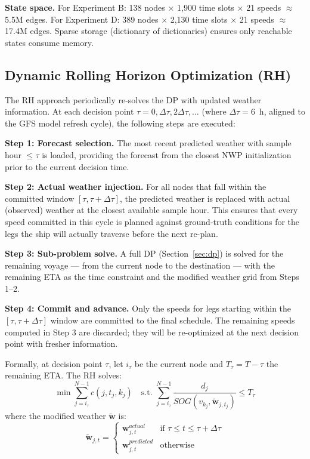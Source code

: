 \documentclass[review]{elsarticle}
\begin{document}
\textbf{State space.} For Experiment B: 138 nodes $\times$ 1,900 time slots $\times$ 21 speeds $\approx$ 5.5M edges. For Experiment D: 389 nodes $\times$ 2,130 time slots $\times$ 21 speeds $\approx$ 17.4M edges. Sparse storage (dictionary of dictionaries) ensures only reachable states consume memory.

\subsection{Dynamic Rolling Horizon Optimization (RH)}
\label{sec:rh}

The RH approach periodically re-solves the DP with updated weather information. At each decision point $\tau = 0, \Delta\tau, 2\Delta\tau, \ldots$ (where $\Delta\tau = 6$~h, aligned to the GFS model refresh cycle), the following steps are executed:

\textbf{Step 1: Forecast selection.} The most recent predicted weather with sample hour $\leq \tau$ is loaded, providing the forecast from the closest NWP initialization prior to the current decision time.

\textbf{Step 2: Actual weather injection.} For all nodes that fall within the committed window $[\tau, \tau + \Delta\tau]$, the predicted weather is replaced with actual (observed) weather at the closest available sample hour. This ensures that every speed committed in this cycle is planned against ground-truth conditions for the legs the ship will actually traverse before the next re-plan.

\textbf{Step 3: Sub-problem solve.} A full DP (Section~\ref{sec:dp}) is solved for the remaining voyage --- from the current node to the destination --- with the remaining ETA as the time constraint and the modified weather grid from Steps 1--2.

\textbf{Step 4: Commit and advance.} Only the speeds for legs starting within the $[\tau, \tau + \Delta\tau]$ window are committed to the final schedule. The remaining speeds computed in Step 3 are discarded; they will be re-optimized at the next decision point with fresher information.

Formally, at decision point $\tau$, let $i_\tau$ be the current node and $T_\tau = T - \tau$ the remaining ETA. The RH solves:
\begin{equation}
    \min \sum_{j=i_\tau}^{N-1} c(j, t_j, k_j) \quad \text{s.t. } \sum_{j=i_\tau}^{N-1} \frac{d_j}{SOG(v_{k_j}, \tilde{\mathbf{w}}_{j,t_j})} \leq T_\tau
    \label{eq:rh-obj}
\end{equation}
where the modified weather $\tilde{\mathbf{w}}$ is:
\begin{equation}
    \tilde{\mathbf{w}}_{j,t} = \begin{cases}
    \mathbf{w}^{actual}_{j,t} & \text{if } \tau \leq t \leq \tau + \Delta\tau \\
    \mathbf{w}^{predicted}_{j,t} & \text{otherwise}
    \end{cases}
    \label{eq:rh-weather}
\end{equation}
\end{document}
